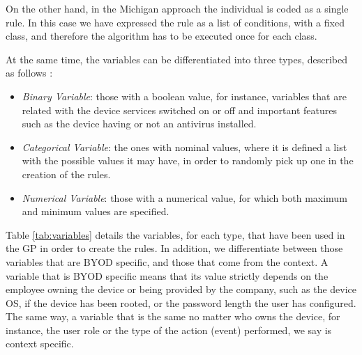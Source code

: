 \documentclass[a4paper,10pt,twocolumn,preprint,3p]{elsarticle}
\begin{document}
On the other hand, in the Michigan approach the individual is coded as a single rule. In this case we have expressed the rule as a list of conditions, with a fixed class, and therefore the algorithm has to be executed once for each class.

At the same time, the variables can be differentiated into three types, described as follows \cite{witten2005data}:

\begin{itemize}
\item {\em Binary Variable}: those with a boolean value, for instance, variables that are related with the device services switched on or off and important features such as the device having or not an antivirus installed. 
\item {\em Categorical Variable}: the ones with nominal values, where it is defined a list with the possible values it may have, in order to randomly pick up one in the creation of the rules. 
\item {\em Numerical Variable}: those with a numerical value, for which both maximum and minimum values are specified. 

\end{itemize}

Table \ref{tab:variables} details the variables, for each type, that have been used in the GP in order to create the rules. In addition, we differentiate between those variables that are BYOD specific, and those that come from the context. A variable that is BYOD specific means that its value strictly depends on the employee owning the device or being provided by the company, such as the device OS, if the device has been rooted, or the password length the user has configured. The same way, a variable that is the same no matter who owns the device, for instance, the user role or the type of the action (event) performed, we say is context specific.
\end{document}
